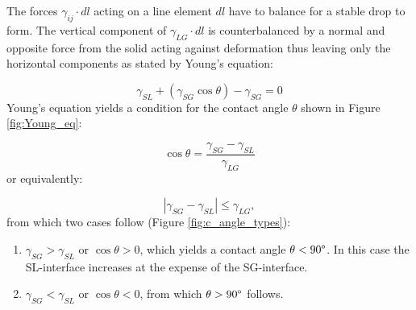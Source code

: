 The forces $\gamma_{ij}\cdot dl$ acting on a line element $dl$ have
to balance for a stable drop to form. The vertical component of $\gamma_{LG}\cdot dl$
is counterbalanced by a normal and opposite force from the solid acting
against deformation thus leaving only the horizontal components as
stated by Young's equation:

\begin{equation}
\gamma_{SL}+(\gamma_{SG}\cos\theta)-\gamma_{SG}=0\label{eq:horizontal-surf_tens}
\end{equation}
Young's equation \cite{young:1805} yields a condition for the contact
angle $\theta$ shown in Figure \ref{fig:Young_eq}:

\begin{equation}
\cos\theta=\frac{\gamma_{SG}-\gamma_{SL}}{\gamma_{LG}}\label{eq:cos_condition}
\end{equation}
or equivalently:

\begin{equation}
\left|\gamma_{SG}-\gamma_{SL}\right|\leq\gamma_{LG},\label{eq:abs_value_cond}
\end{equation}
from which two cases follow (Figure \ref{fig:c_angle_types}):

\begin{enumerate}
\item $\gamma_{SG}>\gamma_{SL}$ or $\cos\theta>0$, which yields a contact
angle $\theta<90\text{\textdegree}$. In this case the SL-interface
increases at the expense of the SG-interface.
\item $\gamma_{SG}<\gamma_{SL}$ or $\cos\theta<0$, from which $\theta>90\text{\textdegree}$
follows.
\end{enumerate}